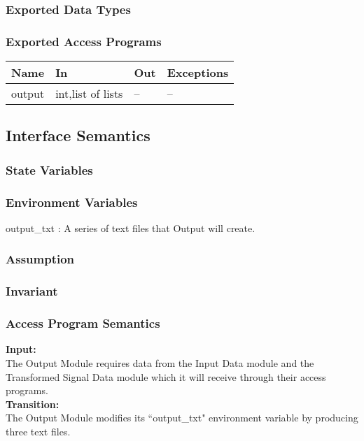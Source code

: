 \documentclass[12pt]{article}
\begin{document}
\subsubsection{Exported Data Types}
\subsubsection{Exported Access Programs}
\begin{center}
\begin{tabular}{l l l l}
\hline
\textbf{Name} & \textbf{In} & \textbf{Out} & \textbf{Exceptions} \\ \hline
output & int,list of lists & -- & --\\
\hline
\end{tabular}
\end{center}
\subsection{Interface Semantics}
\subsubsection{State Variables}
\subsubsection{Environment Variables}
output\_txt : A series of text files that Output will create.
\subsubsection{Assumption}
\subsubsection{Invariant}
\subsubsection{Access Program Semantics}
\textbf{Input:}\\
The Output Module requires data from the Input Data module and the
 Transformed Signal Data 
module which it will receive through their access programs.\\
\textbf{Transition:}\\
The Output Module modifies its ``output\_txt" environment variable by 
producing three text files.
\end{document}

